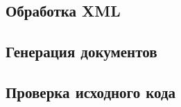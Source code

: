 \subsection{Обработка XML}

\subsection{Генерация документов}

\subsection{Проверка исходного кода}
